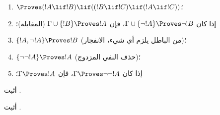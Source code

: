 \documentclass[../../../include/open-logic-section]{subfiles}
\begin{document}
\begin{prop}
\begin{enumerate}
\item $\Proves (!A \lif !B) \lif ((!B \lif !C)
  \lif (!A \lif !C))$؛ 
\item إذا كان $\Gamma \cup \{ \lnot !A\}
  \Proves \lnot !B$، فإن $\Gamma \cup \{ !B\} \Proves
  !A$ (المقابلة)؛ 
\item  $\{ !A, \lnot!A\} \Proves
    !B$ (من الباطل يلزم أي شيء، الانفجار)؛ 
\item  $\{ \lnot\lnot!A\} \Proves
  !A$ (حذف النفي المزدوج)؛
\item إذا كان $\Gamma \Proves \lnot\lnot!A$، فإن $\Gamma \Proves
  !A$؛
\end{enumerate}
\end{prop}

\begin{prob}
  أثبت .
\end{prob}
\tagendprob

\begin{prob}
  أثبت .
\end{prob}
\tagendprob
\end{document}
